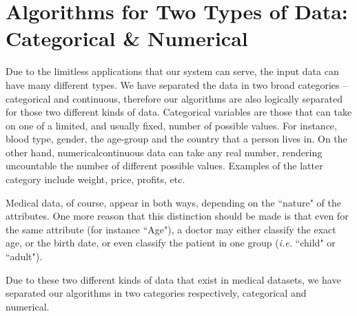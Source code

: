 \section{Algorithms for Two Types of Data: Categorical \& Numerical}\label{s:two-types-of-data}
Due to the limitless applications that our system can serve, the input data can have many different types.
We have separated the data in two broad categories -- categorical and continuous, therefore our algorithms are also logically separated for those two different kinds of data.
Categorical variables are those that can take on one of a limited, and usually fixed, number of possible values.
For instance, blood type, gender, the age-group and the country that a person lives in.
On the other hand, numerical\myslash continuous data can take any real number, rendering uncountable the number of different possible values.
Examples of the latter category include weight, price, profits, etc.

Medical data, of course, appear in both ways, depending on the ``nature" of the attributes.
One more reason that this distinction should be made is that even for the same attribute (for instance ``Age"), a doctor may either classify the exact age, or the birth date, or even classify the patient in one group (\textit{i.e.} ``child" or ``adult").

Due to these two different kinds of data that exist in medical datasets, we have separated our algorithms in two categories respectively, categorical and numerical.







